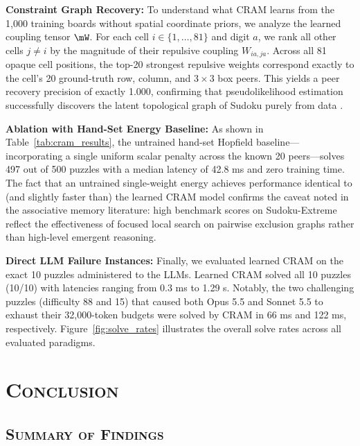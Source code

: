 \documentclass{article} %
\begin{document}
\textbf{Constraint Graph Recovery:} To understand what CRAM learns from the 1,000 training boards without spatial coordinate priors, we analyze the learned coupling tensor $\mW$. For each cell $i \in \{1, \dots, 81\}$ and digit $a$, we rank all other cells $j \neq i$ by the magnitude of their repulsive coupling $W_{ia, ja}$. Across all 81 opaque cell positions, the top-20 strongest repulsive weights correspond exactly to the cell's 20 ground-truth row, column, and $3 \times 3$ box peers. This yields a peer recovery precision of exactly 1.000, confirming that pseudolikelihood estimation successfully discovers the latent topological graph of Sudoku purely from data \citep{Bresler2014EfficientlyLearning}.

\textbf{Ablation with Hand-Set Energy Baseline:} As shown in Table~\ref{tab:cram_results}, the untrained hand-set Hopfield baseline—incorporating a single uniform scalar penalty across the known 20 peers—solves 497 out of 500 puzzles with a median latency of 42.8 ms and zero training time. The fact that an untrained single-weight energy achieves performance identical to (and slightly faster than) the learned CRAM model confirms the caveat noted in the associative memory literature: high benchmark scores on Sudoku-Extreme reflect the effectiveness of focused local search on pairwise exclusion graphs rather than high-level emergent reasoning.

\textbf{Direct LLM Failure Instances:} Finally, we evaluated learned CRAM on the exact 10 puzzles administered to the LLMs. Learned CRAM solved all 10 puzzles (10/10) with latencies ranging from 0.3 ms to 1.29 s. Notably, the two challenging puzzles (difficulty 88 and 15) that caused both Opus 5.5 and Sonnet 5.5 to exhaust their 32,000-token budgets were solved by CRAM in 66 ms and 122 ms, respectively. Figure~\ref{fig:solve_rates} illustrates the overall solve rates across all evaluated paradigms.

\section{\textsc{Conclusion}}
\label{sec:conclusion}

\subsection{\textsc{Summary of Findings}}
\label{subsec:summary_findings}
\end{document}

